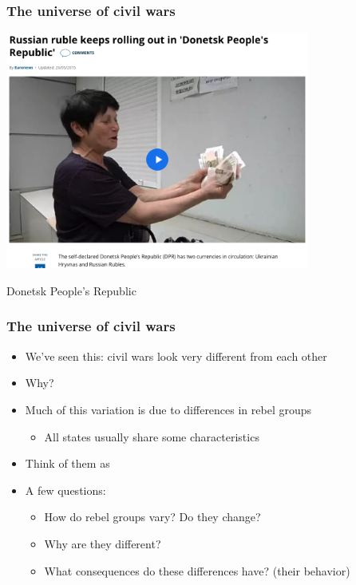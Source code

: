\documentclass[aspectratio=43]{beamer}
\begin{document}
\begin{frame}
\frametitle{The universe of civil wars}
\centering

\includegraphics[width = 0.75\textwidth]{img/donbas}

\vspace{15pt}

Donetsk People's Republic

\end{frame}

\begin{frame}
\frametitle{The universe of civil wars}
\centering

\begin{itemize}
  \item We've seen this: civil wars look very different from each other
  \item Why?
  \item<2-> Much of this variation is due to differences in rebel groups
  \begin{itemize}
    \item All states usually share some characteristics
  \end{itemize}
  \item<3-> Think of them as 
  \item<4-> A few questions:
  \begin{itemize}
    \item<5->[1.] How do rebel groups vary? Do they change?
    \item<6->[2.] Why are they different?
    \item<7->[3.] What consequences do these differences have? (their behavior)
  \end{itemize}
\end{itemize}

\end{frame}
\end{document}
